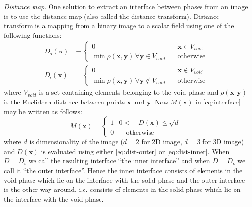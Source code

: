 \documentclass[reprint,amsmath,amssymb,aps,pre,showkeys,showpacs]{revtex4-1}
\begin{document}
\textit{Distance map}.
One solution to extract an interface between phases from an image is to use the
distance map (also called the distance transform). Distance transform is a
mapping from a binary image to a scalar field using one of the following
functions:
\begin{align}
  D_{o}(\mathbf{x}) &= \left\{
  \begin{array}{ll}
    0 & \quad \mathbf{x} \in V_{void} \\
    \min \rho(\mathbf{x}, \mathbf{y}) \ \forall \mathbf{y} \in V_{void} & \quad \text{otherwise}
  \end{array}
  \right. \label{eq:dist-outer} \\
  D_{i}(\mathbf{x}) &= \left\{
  \begin{array}{ll}
    0 & \quad \mathbf{x} \not\in V_{void} \\
    \min \rho(\mathbf{x}, \mathbf{y}) \ \forall \mathbf{y} \not\in V_{void} & \quad \text{otherwise}
  \end{array}
  \right. \label{eq:dist-inner}
\end{align}
where $V_{void}$ is a set containing elements belonging to the void phase and
$\rho(\mathbf{x}, \mathbf{y})$ is the Euclidean distance between points
$\mathbf{x}$ and $\mathbf{y}$. Now $M(\mathbf{x})$ in \cref{eq:interface} may be
written as follows:
\begin{equation*}
  M(\mathbf{x}) = \left\{
  \begin{array}{ll}
    1 & 0 < \quad D(\mathbf{x}) \le \sqrt{d} \\
    0 & \quad \text{otherwise}
  \end{array}
  \right.
\end{equation*}
where $d$ is dimensionality of the image ($d = 2$ for 2D image, $d = 3$ for 3D
image) and $D(\mathbf{x})$ is evaluated using either \cref{eq:dist-outer} or
\cref{eq:dist-inner}. When $D = D_i$ we call the resulting interface
``the inner interface'' and when $D = D_o$ we call it ``the outer
interface''. Hence the inner interface consists of elements in the void phase
which lie on the interface with the solid phase and the outer interface is the other way
around, i.e. consists of elements in the solid phase which lie on the interface
with the void phase.
\end{document}
